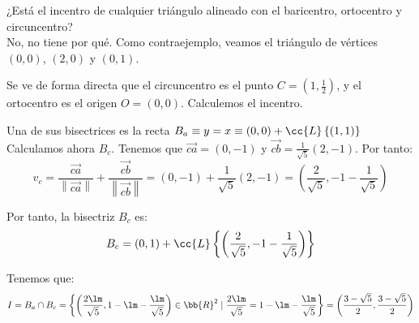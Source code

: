 \begin{ejercicio}
    ¿Está el incentro de cualquier triángulo alineado con el baricentro, ortocentro y circuncentro?\\

    No, no tiene por qué. Como contraejemplo, veamos el triángulo de vértices $(0,0)$, $(2,0)$ y $(0,1)$.
    \begin{figure}[H]
        \centering
    \end{figure}
    Se ve de forma directa que el circuncentro es el punto $C=\left(1,\frac{1}{2}\right)$, y el ortocentro es el origen $O=(0,0)$. Calculemos el incentro.
    
    Una de sus bisectrices es la recta $B_a \equiv y=x \equiv (0,0) + \cc{L}\left\{(1,1)\right\}$
    Calculamos ahora $B_c$. Tenemos que $\vec{ca} = (0,-1)$ y $\vec{cb} = \frac{1}{\sqrt{5}}(2,-1)$. Por tanto:
    \begin{equation*}
        v_c = \frac{\vec{ca}}{\left\|\vec{ca}\right\|} + \frac{\vec{cb}}{\left\|\vec{cb}\right\|} = (0,-1) + \frac{1}{\sqrt{5}}(2,-1) = \left(\frac{2}{\sqrt{5}}, -1-\frac{1}{\sqrt{5}}\right)
    \end{equation*}

    Por tanto, la bisectriz $B_c$ es:
    \begin{equation*}
        B_c = (0,1) + \cc{L}\left\{\left(\frac{2}{\sqrt{5}}, -1-\frac{1}{\sqrt{5}}\right)\right\}
    \end{equation*}

    Tenemos que:
    \begin{equation*}
        I=B_a\cap B_c = \left\{\left(\frac{2\lm}{\sqrt{5}}, 1-\lm -\frac{\lm}{\sqrt{5}}\right)\in \bb{R}^2 \mid \frac{2\lm}{\sqrt{5}} = 1 -\lm -\frac{\lm}{\sqrt{5}}\right\}
        = \left(\frac{3-\sqrt{5}}{2},\frac{3-\sqrt{5}}{2}\right)
    \end{equation*}


\end{ejercicio}
